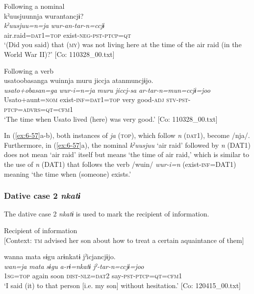 \ea\label{ex:6-57}
\ea Following a nominal\\
{\US}
\glll kˀuusjuunnja  wurantancjɨ?\\
 \textit{kˀuusjuu=n=ja}  \textit{wur-an-tar-n=ccjɨ}\\
      air.raid=\textsc{dat}1=\textsc{top}  exist-\textsc{neg}-\textsc{pst}-\textsc{ptcp}=\textsc{qt}\\
\glt ‘(Did you said) that (\textsc{my}) was not living here at the time of the air raid (in the World War II)?’ [Co: 110328\_00.txt]

\ex Following a verb\\
{\TM}
\glll  usato{\textbar}obasan{\textbar}ga  wuinnja  muru  jiccja atanmuncjɨjo.\\
\textit{usato+obasan=ga}  \textit{wur-i=n=ja}  \textit{muru}  \textit{jiccj-sa} \textit{ar-tar-n=mun=ccjɨ=joo}\\
Usato+aunt=\textsc{nom}  exist-\textsc{inf}=\textsc{dat}1=\textsc{top}  very  good-\textsc{adj}  \textsc{stv}-\textsc{pst}-\textsc{ptcp}=\textsc{advrs}=\textsc{qt}=\textsc{cfm}1\\
\glt ‘The time when Usato lived (here) was very good.’ [Co: 110328\_00.txt]
\z
\z

In (\ref{ex:6-57}a-b), both instances of \textit{ja} (\textsc{top}), which follow \textit{n} (\textsc{dat}1), become /nja/. Furthermore, in (\ref{ex:6-57}a), the nominal \textit{kˀuusjuu} ‘air raid’ followed by \textit{n} (DAT1) does not mean ‘air raid’ itself but means ‘the time of air raid,’ which is similar to the use of \textit{n} (DAT1) that follows the verb /wuin/ \textit{wur-i=n} (exist-\textsc{inf}=DAT1) meaning ‘the time when (someone) exists.’

\subsubsection{Dative case 2 \textit{nkatɨ}}

The dative case 2 \textit{nkatɨ} is used to mark the recipient of information.

\ea\label{ex:6-58}
 Recipient of information\\{}
[Context: \textsc{tm} advised her son about how to treat a certain aquaintance of them]

{\TM}
\glll wanna  mata  sɨgu  arɨnkatɨ  jˀicjancjɨjo.\\
\textit{wan=ja}  \textit{mata}  \textit{sɨgu}  \textit{a-rɨ=nkatɨ}  \textit{jˀ-tar-n=ccjɨ=joo}\\
    1\textsc{sg}=\textsc{top}  again  soon  \textsc{dist}-\textsc{nlz}=\textsc{dat}2  say-\textsc{pst}-\textsc{ptcp}=\textsc{qt}=\textsc{cfm}1\\
\glt    ‘I said (it) to that person [i.e. my son] without hesitation.’ [Co: 120415\_00.txt]
\z

